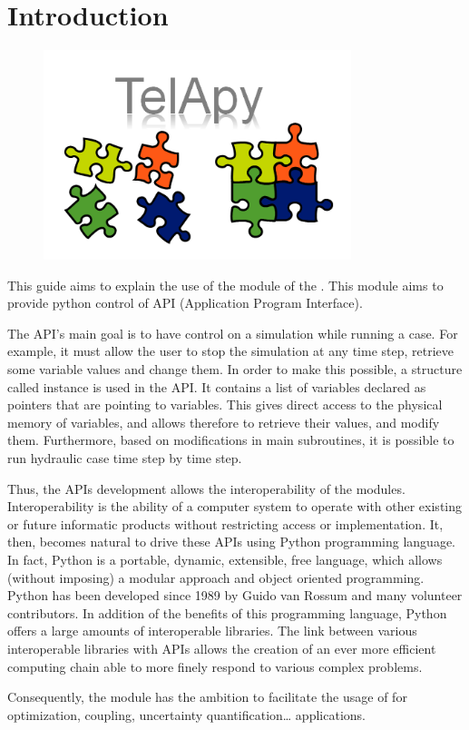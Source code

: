 \chapter{Introduction}\label{ch:intro}

\begin{figure}[H]%
\begin{center}
%
  \includegraphics[width=0.8\textwidth]{./Figures/TelApy.png}
%
\end{center}\label{fig:telApy}
\end{figure}

This guide aims to explain the use of the \TelApy{} module
of the \telemacsystem. This module aims to provide python control of \tel{} API
(Application Program Interface).

The API’s main goal is to have control on a simulation while running a case.
For example, it must allow the user to stop the simulation at any time step,
retrieve some variable values and change them. In order to make this possible,
a \fortran{} structure called instance is used in the API\@. It contains a
list of variables declared as pointers that are pointing to variables.
This gives direct access to the physical memory of variables, and allows
therefore to retrieve their values, and modify them. Furthermore, based on modifications
in \tel{} main subroutines, it is possible to run hydraulic case time step by time step.

Thus, the APIs development allows the interoperability of the \telemacsystem{}
modules. Interoperability is the ability of a computer system to operate with
other existing or future informatic products without restricting access or
implementation.
It, then, becomes natural to drive these APIs using Python programming
language. In fact, Python is a portable, dynamic, extensible, free language,
which allows (without imposing) a modular approach and object oriented
programming. Python has been developed since 1989 by Guido van Rossum and many
volunteer contributors. In addition of the benefits of this programming
language, Python offers a large amounts of interoperable libraries. The link
between various interoperable libraries with \telemacsystem{} APIs allows the
creation of an ever more efficient computing chain able to more finely respond
to various complex problems.

Consequently, the \TelApy{} module has the ambition to facilitate the usage of
\telemacsystem{} for optimization, coupling, uncertainty quantification\ldots
 applications.
